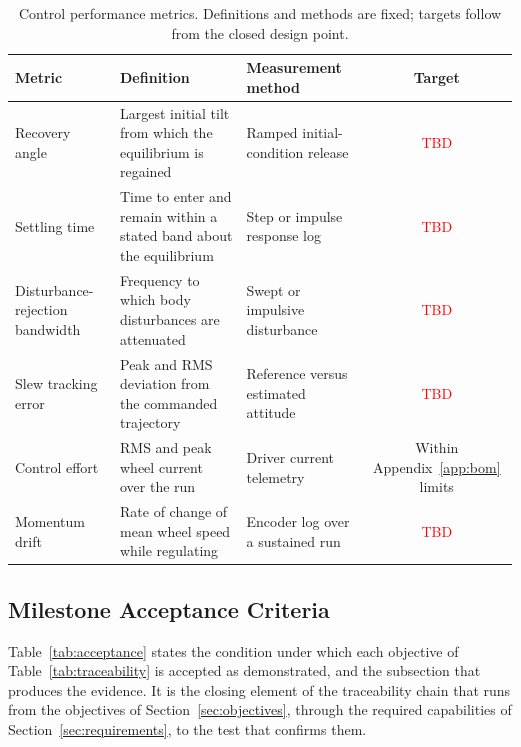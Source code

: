 \begin{table}[htbp]
\centering
\caption[Control performance metrics]{Control performance metrics. Definitions and methods are fixed;
targets follow from the closed design point.}
\label{tab:perf_metrics}
\small
\setlength{\tabcolsep}{4pt}
\begin{tabular}{L{2.8cm} L{4.7cm} L{4.1cm} c}
\toprule
Metric & Definition & Measurement method & Target \\
\midrule
Recovery angle & Largest initial tilt from which the equilibrium is regained & Ramped initial-condition release & \textcolor{red}{TBD} \\
Settling time & Time to enter and remain within a stated band about the equilibrium & Step or impulse response log & \textcolor{red}{TBD} \\
Disturbance-rejection bandwidth & Frequency to which body disturbances are attenuated & Swept or impulsive disturbance & \textcolor{red}{TBD} \\
Slew tracking error & Peak and RMS deviation from the commanded trajectory & Reference versus estimated attitude & \textcolor{red}{TBD} \\
Control effort & RMS and peak wheel current over the run & Driver current telemetry & Within Appendix~\ref{app:bom} limits \\
Momentum drift & Rate of change of mean wheel speed while regulating & Encoder log over a sustained run & \textcolor{red}{TBD} \\
\bottomrule
\end{tabular}
\end{table}

\subsection{Milestone Acceptance Criteria}
\label{sec:test_acceptance}

Table~\ref{tab:acceptance} states the condition under which each objective of
Table~\ref{tab:traceability} is accepted as demonstrated, and the subsection that
produces the evidence. It is the closing element of the traceability chain that
runs from the objectives of Section~\ref{sec:objectives}, through the required
capabilities of Section~\ref{sec:requirements}, to the test that confirms them.


